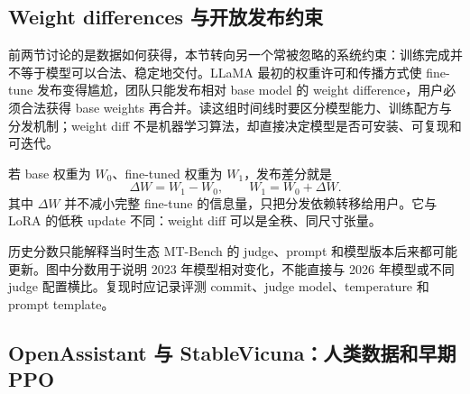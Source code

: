 
\subsection{Weight differences 与开放发布约束}

前两节讨论的是数据如何获得，本节转向另一个常被忽略的系统约束：训练完成并不等于模型可以合法、稳定地交付。LLaMA 最初的权重许可和传播方式使 fine-tune 发布变得尴尬，团队只能发布相对 base model 的 weight difference，用户必须合法获得 base weights 再合并。读这组时间线时要区分模型能力、训练配方与分发机制；weight diff 不是机器学习算法，却直接决定模型是否可安装、可复现和可迭代。



若 base 权重为 $W_0$、fine-tuned 权重为 $W_1$，发布差分就是
\[
\Delta W=W_1-W_0,\qquad W_1=W_0+\Delta W.
\]
其中 $\Delta W$ 并不减小完整 fine-tune 的信息量，只把分发依赖转移给用户。它与 LoRA 的低秩 update 不同：weight diff 可以是全秩、同尺寸张量。



\begin{warningbox}{历史分数只能解释当时生态}
MT-Bench 的 judge、prompt 和模型版本后来都可能更新。图中分数用于说明 2023 年模型相对变化，不能直接与 2026 年模型或不同 judge 配置横比。复现时应记录评测 commit、judge model、temperature 和 prompt template。
\end{warningbox}


\subsection{OpenAssistant 与 StableVicuna：人类数据和早期 PPO}

